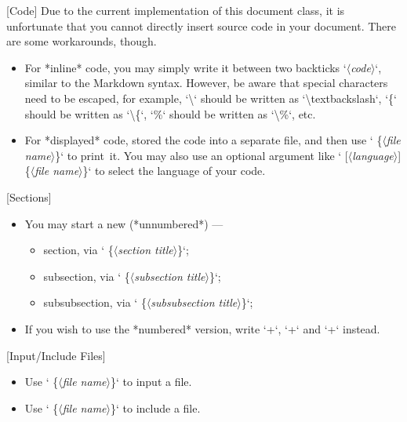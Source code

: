 \documentclass[%
  use style = classical,
  scroll,
]{Q-and-A}
\newcommand{\meta}[1]{$\langle${\normalfont\itshape#1}$\rangle$}
\begin{document}
  [Code]
  Due to the current implementation of this document class, it is unfortunate that you cannot directly insert source code in your document. There are some workarounds, though.
  \begin{itemize}
    \item For *inline* code, you may simply write it between two backticks `\textbacktick\meta{code}\textbacktick`, similar to the Markdown syntax. However, be aware that special characters need to be escaped, for example, `\textbackslash` should be written as `\textbackslash textbackslash`, `\{` should be written as `\textbackslash\{`, `\%` should be written as `\textbackslash\%`, etc.
    \item For *displayed* code, stored the code into a separate file, and then use `\textequalsign\textequalsign{} \{\meta{file name}\}` to print~it. You may also use an optional argument like `\textequalsign\textequalsign{} [\meta{language}] \{\meta{file name}\}` to select the language of your code.
  \end{itemize}

  [Sections]
  \begin{itemize}
    \item You may start a new (*unnumbered*) ---
    \begin{itemize}
      \item section, via `\textsharp\textsharp{} \{\meta{section title}\}`;
      \item subsection, via `\textsharp\textsharp\textsharp{} \{\meta{subsection title}\}`;
      \item subsubsection, via `\textsharp\textsharp\textsharp\textsharp{} \{\meta{subsubsection title}\}`;
    \end{itemize}
    \item If you wish to use the *numbered* version, write `\textsharp\textsharp+`, `\textsharp\textsharp\textsharp+` and `\textsharp\textsharp\textsharp\textsharp+` instead.
  \end{itemize}

  [Input/Include Files]
  \begin{itemize}
    \item Use `\textcolon\textcolon{} \{\meta{file name}\}` to input a file.
    \item Use `\textcolon\textcolon\textcolon{} \{\meta{file name}\}` to include a file.
  \end{itemize}
\end{document}
